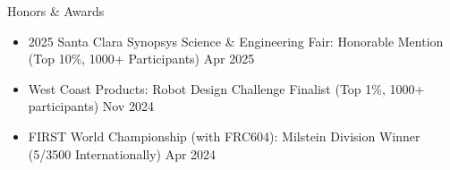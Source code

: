 \documentclass[
  10pt, %
]{resume}
\begin{document}

\begin{rSection}{Honors \& Awards}

  \begin{itemize}
      \setlength\itemsep{-0.7em} %
      \item 2025 Santa Clara Synopsys Science \& Engineering Fair: Honorable Mention (Top 10\%, 1000+ Participants) \hfill Apr 2025
      \item West Coast Products: Robot Design Challenge Finalist (Top 1\%, 1000+ participants) \hfill Nov 2024
      \item FIRST World Championship (with FRC604): Milstein Division Winner (5/3500 Internationally) \hfill Apr 2024

    \end{itemize}

\end{rSection}
\end{document}
